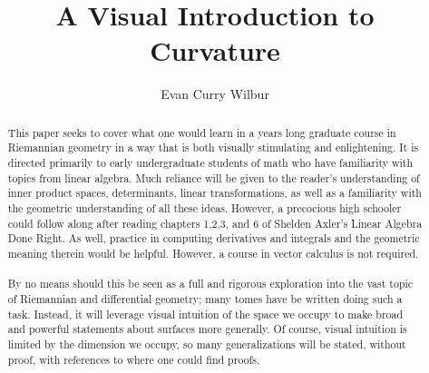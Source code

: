 \documentclass[]{article}
\title{A Visual Introduction to Curvature}
\author{Evan Curry Wilbur}
\newcommand\<{\ensuremath{\left\langle}}
\renewcommand\>{\ensuremath{\right\rangle}}
\begin{document}
	\maketitle
	
	\begin{abstract}
		This paper seeks to cover what one would learn in a years long graduate course in Riemannian geometry in a way that is both visually stimulating and enlightening. It is directed primarily to early undergraduate students of math who have familiarity with topics from linear algebra. Much reliance will be given to the reader's understanding of inner product spaces, determinants, linear transformations, as well as a familiarity with the geometric understanding of all these ideas. However, a precocious high schooler could follow along after reading chapters 1,2,3, and 6 of Shelden Axler's Linear Algebra Done Right. As well, practice in computing derivatives and integrals and the geometric meaning therein would be helpful. However, a course in vector calculus is not required.
		\\
		\\
		\indent
		By no means should this be seen as a full and rigorous exploration into the vast topic of Riemannian and differential geometry; many tomes have be written doing such a task. Instead, it will leverage visual intuition of the space we occupy to make broad and powerful statements about surfaces more generally. Of course, visual intuition is limited by the dimension we occupy, so many generalizations will be stated, without proof, with references to where one could find proofs.
	\end{abstract}
	
\end{document}
